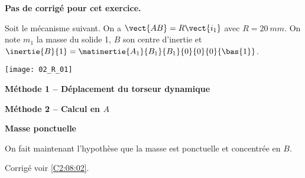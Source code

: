 \normaltrue
\correctionfalse


\setcounter{numques}{0}
\ifcorrection
\else
\textbf{Pas de corrigé pour cet exercice.}
\fi

\ifprof
\else
Soit le mécanisme suivant. On a $\vect{AB}=R\vect{i_1}$ avec $R=\SI{20}{mm}$. 
On note $m_1$ la masse du solide 1, $B$ son centre d'inertie et $\inertie{B}{1}=\matinertie{A_1}{B_1}{B_1}{0}{0}{0}{\bas{1}}$.

\begin{center}
\texttt{[image: 02\_R\_01]}
\end{center}
\fi

\textbf{Méthode 1 -- Déplacement du torseur dynamique}

\ifprof
\else
\fi

\ifprof
\else
\fi

\textbf{Méthode 2 -- Calcul en $A$}


\ifprof
\else
\fi

\textbf{Masse ponctuelle}

On fait maintenant l'hypothèse que la masse est ponctuelle et concentrée en $B$.

\ifprof
\else
\fi

\ifprof
\else
\fi


\ifprof
\else
\begin{flushright}
\footnotesize{Corrigé  voir \ref{C2:08:02}.}
\end{flushright}%
\fi